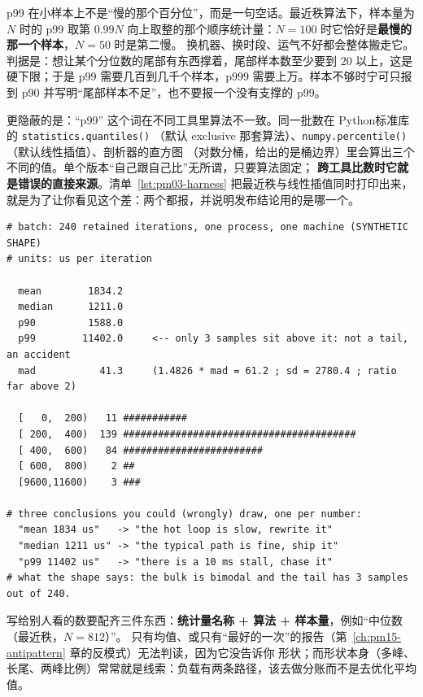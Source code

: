 \documentclass[12pt,a4paper,fontset=fandol]{ctexbook}
\newcommand{\Fn}[1]{\texttt{#1()}}
\newcommand{\Bk}{\discretionary{}{}{}}
\newcommand{\Lang}[1]{\textsf{#1}}
\newcommand{\PY}{\Lang{Python}}
\newcommand{\Mx}[1]{\textsf{#1}}
\begin{document}
\Mx{p99} 在小样本上不是``慢的那个百分位''，而是一句空话。最近秩算法下，样本量为 $N$ 时的 \Mx{p99}
取第 $0.99N$ 向上取整的那个顺序统计量：$N = 100$ 时它恰好是\textbf{最慢的那一个样本}，$N = 50$ 时是第二慢。
换机器、换时段、运气不好都会整体搬走它。判据是：想让某个分位数的尾部有东西撑着，尾部样本数至少要到
$20$ 以上，这是硬下限；于是 \Mx{p99} 需要几百到几千个样本，\Mx{p999} 需要上万。样本不够时宁可只报到
\Mx{p90} 并写明``尾部样本不足''，也不要报一个没有支撑的 \Mx{p99}。

更隐蔽的是：``p99'' 这个词在不同工具里算法不一致。同一批数在 \PY 标准库的 \Fn{statistics{\Bk}.quantiles}
（默认 exclusive 那套算法）、\Fn{numpy{\Bk}.percentile}（默认线性插值）、剖析器的直方图
（对数分桶，给出的是桶边界）里会算出三个不同的值。单个版本``自己跟自己比''无所谓，只要算法固定；
\textbf{跨工具比数时它就是错误的直接来源}。清单~\ref{lst:pm03-harness} 把最近秩与线性插值同时打印出来，
就是为了让你看见这个差：两个都报，并说明发布结论用的是哪一个。

\begin{lstlisting}[style=outstyle, caption={\textbf{示意输出 / 格式示例（非本仓库实测值）}：同一份 $240$ 个迭代样本，换一个统计量就换一个结论；数值是为说明分布形状而构造的}, label={lst:pm03-threeways}]
# batch: 240 retained iterations, one process, one machine (SYNTHETIC SHAPE)
# units: us per iteration

  mean        1834.2
  median      1211.0
  p90         1588.0
  p99        11402.0     <-- only 3 samples sit above it: not a tail, an accident
  mad           41.3     (1.4826 * mad = 61.2 ; sd = 2780.4 ; ratio far above 2)

  [   0,  200)   11 ###########
  [ 200,  400)  139 ########################################
  [ 400,  600)   84 ########################
  [ 600,  800)    2 ##
  [9600,11600)    3 ###

# three conclusions you could (wrongly) draw, one per number:
  "mean 1834 us"   -> "the hot loop is slow, rewrite it"
  "median 1211 us" -> "the typical path is fine, ship it"
  "p99 11402 us"   -> "there is a 10 ms stall, chase it"
# what the shape says: the bulk is bimodal and the tail has 3 samples out of 240.
\end{lstlisting}

写给别人看的数要配齐三件东西：\textbf{统计量名称 + 算法 + 样本量}，例如``中位数（最近秩，$N=812$）''。
只有均值、或只有``最好的一次''的报告（第~\ref{ch:pm15-antipattern} 章的反模式）无法判读，因为它没告诉你
形状；而形状本身（多峰、长尾、两峰比例）常常就是线索：负载有两条路径，该去做分账而不是去优化平均值。
\end{document}
